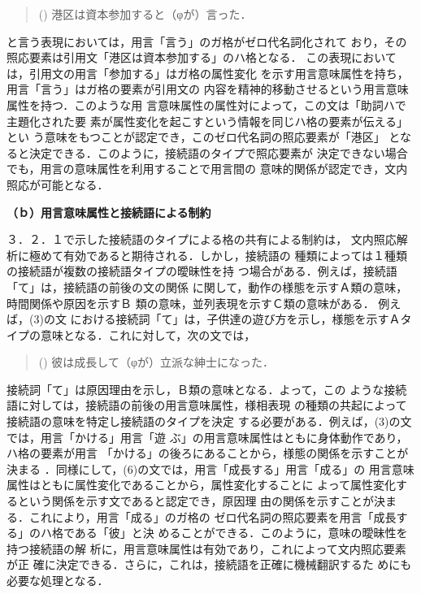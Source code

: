 \begin{quote}
() 港区は資本参加すると（φが）言った．
\end{quote}

\noindent
と言う表現においては，用言「言う」のガ格がゼロ代名詞化されて
おり，その照応要素は引用文「港区は資本参加する」のハ格となる．
この表現においては，引用文の用言「参加する」はガ格の属性変化
を示す用言意味属性を持ち，用言「言う」はガ格の要素が引用文の
内容を精神的移動させるという用言意味属性を持つ．このような用
言意味属性の属性対によって，この文は「助詞ハで主題化された要
素が属性変化を起こすという情報を同じハ格の要素が伝える」とい
う意味をもつことが認定でき，このゼロ代名詞の照応要素が「港区」
となると決定できる．このように，接続語のタイプで照応要素が
決定できない場合でも，用言の意味属性を利用することで用言間の
意味的関係が認定でき，文内照応が可能となる．

\vspace{2mm}
\noindent
{\bf （ｂ）用言意味属性と接続語による制約}

\vspace{1mm}
３．２．１で示した接続語のタイプによる格の共有による制約は，
文内照応解析に極めて有効であると期待される．しかし，接続語の
種類によっては１種類の接続語が複数の接続語タイプの曖昧性を持
つ場合がある．例えば，接続語「て」は，接続語の前後の文の関係
に関して，動作の様態を示すＡ類の意味，時間関係や原因を示すＢ
類の意味，並列表現を示すＣ類の意味がある． 例えば，(3)の文
における接続詞「て」は，子供達の遊び方を示し，様態を示すＡタ
イプの意味となる．これに対して，次の文では，

\begin{quote}
() 彼は成長して（φが）立派な紳士になった．
\end{quote}

\noindent
接続詞「て」は原因理由を示し，Ｂ類の意味となる．よって，この
ような接続語に対しては，接続語の前後の用言意味属性，様相表現
の種類の共起によって接続語の意味を特定し接続語のタイプを決定
する必要がある．例えば，(3)の文では，用言「かける」用言「遊
ぶ」の用言意味属性はともに身体動作であり，ハ格の要素が用言
「かける」の後ろにあることから，様態の関係を示すことが決まる
．同様にして，(6)の文では，用言「成長する」用言「成る」の
用言意味属性はともに属性変化であることから，属性変化することに
よって属性変化するという関係を示す文であると認定でき，原因理
由の関係を示すことが決まる．これにより，用言「成る」のガ格の
ゼロ代名詞の照応要素を用言「成長する」のハ格である「彼」と決
めることができる．このように，意味の曖昧性を持つ接続語の解
析に，用言意味属性は有効であり，これによって文内照応要素が正
確に決定できる．さらに，これは，接続語を正確に機械翻訳するた
めにも必要な処理となる．

